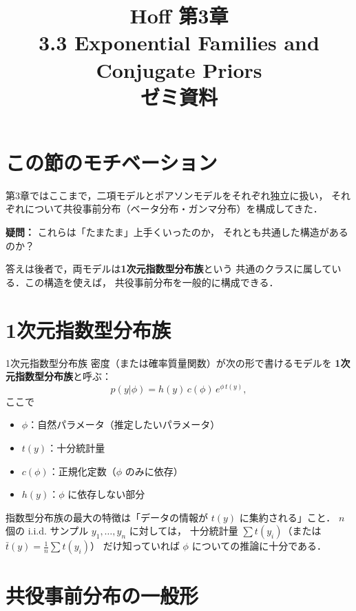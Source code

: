 \documentclass[lualatex,ja=standard,a4paper,12pt]{bxjsarticle}
\title{{\large Hoff 第3章} \\[6pt]
       \textbf{3.3\; Exponential Families and Conjugate Priors} \\[4pt]
       {\normalsize ゼミ資料}}
\author{}
\date{}
\begin{document}
\maketitle
\thispagestyle{empty}

\section{この節のモチベーション}

第3章ではここまで，二項モデルとポアソンモデルをそれぞれ独立に扱い，
それぞれについて共役事前分布（ベータ分布・ガンマ分布）を構成してきた．

\medskip
\noindent\textbf{疑問：} これらは「たまたま」上手くいったのか，
それとも共通した構造があるのか？

\medskip
\noindent 答えは後者で，両モデルは\textbf{1次元指数型分布族}という
共通のクラスに属している．この構造を使えば，
共役事前分布を一般的に構成できる．

\section{1次元指数型分布族}

\begin{defbox}{1次元指数型分布族}
密度（または確率質量関数）が次の形で書けるモデルを
\textbf{1次元指数型分布族}と呼ぶ：
\[
  p(y|\phi) = h(y)\,c(\phi)\,e^{\phi\, t(y)},
\]
ここで
\begin{itemize}
  \item $\phi$：自然パラメータ（推定したいパラメータ）
  \item $t(y)$：十分統計量
  \item $c(\phi)$：正規化定数（$\phi$ のみに依存）
  \item $h(y)$：$\phi$ に依存しない部分
\end{itemize}
\end{defbox}

\begin{pointbox}
指数型分布族の最大の特徴は「データの情報が $t(y)$ に集約される」こと．
$n$ 個の i.i.d. サンプル $y_1,\ldots,y_n$ に対しては，
十分統計量 $\sum t(y_i)$（または $\bar{t}(y) = \frac{1}{n}\sum t(y_i)$）
だけ知っていれば $\phi$ についての推論に十分である．
\end{pointbox}

\section{共役事前分布の一般形}
\end{document}
